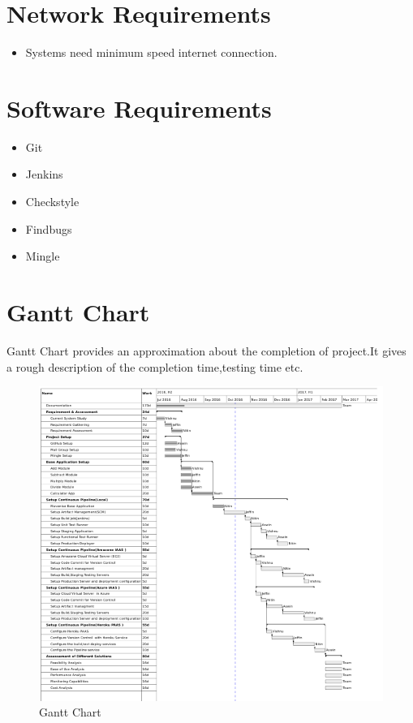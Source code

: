 \documentclass[12pt,a4paper,oneside]{report}
\begin{document}
 
 \pagebreak
\section{Network Requirements}  
\begin{itemize}
\item Systems need minimum speed internet connection.
\end{itemize}
\section{Software Requirements}
\begin{itemize}
\item Git\item Jenkins\item Checkstyle \item Findbugs \item Mingle
\end{itemize}
\pagebreak
\section{Gantt Chart}
Gantt Chart provides an approximation about the completion of project.It gives a rough description of the completion time,testing time etc.
\begin{figure}[h]
\begin{center}
\includegraphics[scale=1]{gnt.png}
\caption{Gantt Chart}
\end{center}
\end{figure}
\end{document}
